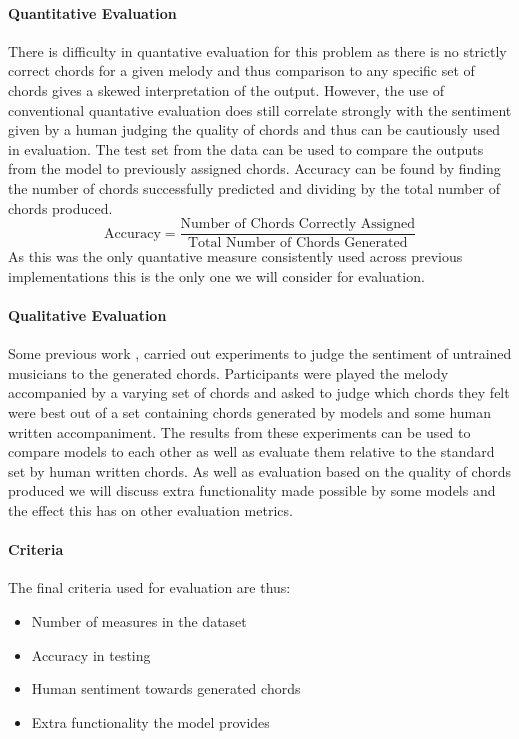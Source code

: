 \paragraph{Quantitative Evaluation}
There is difficulty in quantative evaluation for this problem as there is no strictly correct chords for a given melody and thus comparison to any specific set of chords gives a skewed interpretation of the output.
However, the use of conventional quantative evaluation does still correlate strongly with the sentiment given by a human judging the quality of chords and thus can be cautiously used in evaluation.
The test set from the data can be used to compare the outputs from the model to previously assigned chords. Accuracy can be found by finding the number of chords successfully predicted and dividing by the total number of chords produced.
\begin{equation}
    \text{Accuracy} = \frac{\text{Number of Chords Correctly Assigned}}{\text{Total Number of Chords Generated}}
\end{equation}
As this was the only quantative measure consistently used across previous implementations this is the only one we will consider for evaluation.

\paragraph{Qualitative Evaluation}
Some previous work \cite{MySong}, \cite{BLSTM} carried out experiments to judge the sentiment of untrained musicians to the generated chords.
Participants were played the melody accompanied by a varying set of chords and asked to judge which chords they felt were best out of a set containing chords generated by models and some human written accompaniment.
The results from these experiments can be used to compare models to each other as well as evaluate them relative to the standard set by human written chords.
As well as evaluation based on the quality of chords produced we will discuss extra functionality made possible by some models and the effect this has on other evaluation metrics.

\paragraph{Criteria}
The final criteria used for evaluation are thus:
\begin{itemize}
    \item Number of measures in the dataset
    \item Accuracy in testing
    \item Human sentiment towards generated chords
    \item Extra functionality the model provides
\end{itemize}
